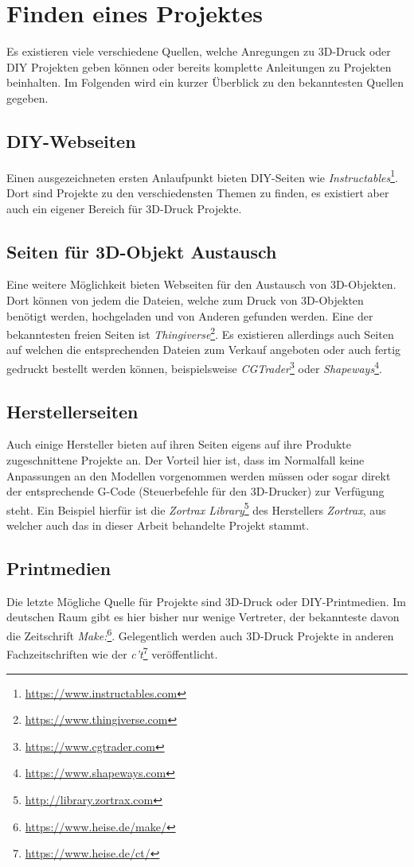 \chapter{Finden eines Projektes}
Es existieren viele verschiedene Quellen, welche Anregungen zu 3D-Druck oder \ac{DIY} Projekten geben können oder bereits komplette Anleitungen zu Projekten beinhalten. Im Folgenden wird ein kurzer Überblick zu den bekanntesten Quellen gegeben.

\section{DIY-Webseiten}
Einen ausgezeichneten ersten Anlaufpunkt bieten \ac{DIY}-Seiten wie \textit{Instructables}\footnote{\url{https://www.instructables.com}}. Dort sind Projekte zu den verschiedensten Themen zu finden, es existiert aber auch ein eigener Bereich für 3D-Druck Projekte.

\section{Seiten für 3D-Objekt Austausch}
Eine weitere Möglichkeit bieten Webseiten für den Austausch von 3D-Objekten. Dort können von jedem die Dateien, welche zum Druck von 3D-Objekten benötigt werden, hochgeladen und von Anderen gefunden werden. Eine der bekanntesten freien Seiten ist \textit{Thingiverse}\footnote{\url{https://www.thingiverse.com}}. Es existieren allerdings auch Seiten auf welchen die entsprechenden Dateien zum Verkauf angeboten oder auch fertig gedruckt bestellt werden können, beispielsweise \textit{CGTrader}\footnote{\url{https://www.cgtrader.com}} oder \textit{Shapeways}\footnote{\url{https://www.shapeways.com}}.

\section{Herstellerseiten}
Auch einige Hersteller bieten auf ihren Seiten eigens auf ihre Produkte zugeschnittene Projekte an. Der Vorteil hier ist, dass im Normalfall keine Anpassungen an den Modellen vorgenommen werden müssen oder sogar direkt der entsprechende G-Code (Steuerbefehle für den 3D-Drucker) zur Verfügung steht. Ein Beispiel hierfür ist die \textit{Zortrax Library}\footnote{\url{http://library.zortrax.com}} des Herstellers \textit{Zortrax}, aus welcher auch das in dieser Arbeit behandelte Projekt stammt.

\section{Printmedien}
Die letzte Mögliche Quelle für Projekte sind 3D-Druck oder \ac{DIY}-Printmedien. Im deutschen Raum gibt es hier bisher nur wenige Vertreter, der bekannteste davon die Zeitschrift \textit{Make:}\footnote{\url{https://www.heise.de/make/}}. Gelegentlich werden auch 3D-Druck Projekte in anderen Fachzeitschriften wie der \textit{c't}\footnote{\url{https://www.heise.de/ct/}} veröffentlicht.